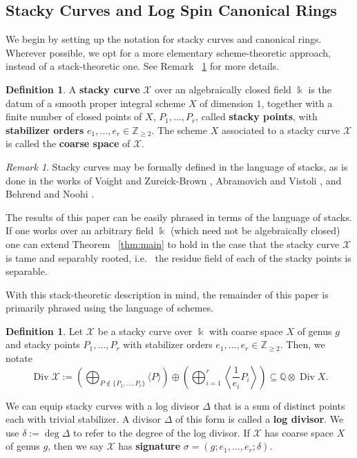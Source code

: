\documentclass{amsart}
\theoremstyle{plain}
\theoremstyle{definition}
\newtheorem{defn}[thm]{Definition}
\theoremstyle{remark}
\newtheorem{rem}[thm]{Remark}
\numberwithin{equation}{section}
\newcommand\ssec{\subsection}
\newcommand\BQ{{\mathbb Q}}
\newcommand\BZ{{\mathbb Z}}
\newcommand\Bk{{\Bbbk}}
\DeclareMathOperator\di{Div}
\newcommand\sx{\mathscr X}
\begin{document}
\ssec{Stacky Curves and Log Spin Canonical Rings}
\label{ssec:stacky-background}
We begin by setting up the notation for stacky curves and canonical rings. Wherever possible, we opt for a more elementary scheme-theoretic approach, instead of a stack-theoretic one. See Remark ~\ref{rem:stack-formalism} for more details.

\begin{defn}
\label{defn:stacky-curve}
A \textbf{stacky curve} $\sx$ over an algebraically closed field $\Bk$ is the datum of a smooth proper integral scheme $X$ of dimension $1$, together with a finite number of closed points of $X$, $P_1, \ldots, P_r$, called {\bf stacky points}, with {\bf stabilizer orders} $e_1, \ldots, e_r \in \BZ_{\geq 2}.$ The scheme $X$ associated to a stacky curve $\sx$ is called the {\bf coarse space} of $\sx$.
\end{defn}

\begin{rem}
\label{rem:stack-formalism}
Stacky curves may be formally defined in the language of stacks, as
is done in the works of Voight and Zureick-Brown \cite{vzb:stacky},
Abramovich and Vistoli \cite{abramovich-vistoli:compactifying}, and
Behrend and Noohi \cite{behrend-noohi:uniformization}.

The results of this paper can be easily phrased in terms of the language of stacks. If one works over an arbitrary field $\Bk$ (which need not be algebraically closed) one can extend Theorem ~\ref{thm:main} to hold in the case that the stacky curve $\sx$ is tame and separably rooted, i.e.~ the residue field of each
of the stacky points is separable.

With this stack-theoretic description in mind, the remainder of this paper is primarily phrased using the language
of schemes.
\end{rem}

\begin{defn}
\label{defn:div-ex}
Let $\sx$ be a stacky curve over $\Bk$ with coarse space $X$ of genus $g$ and stacky points $P_1, \ldots,
P_r$ with stabilizer orders $e_1, \ldots, e_r \in \BZ_{\geq 2}$.
Then, we notate
\[
	\di \sx := \left(\bigoplus_{P\notin \{P_1, \ldots, P_r\}} \langle 
	P \rangle \right) \oplus \left(\bigoplus_{i = 1}^r \left \langle 
	\frac{1}{e_i}P_i \right \rangle \right) \subseteq \BQ \otimes \di X.
\]
\end{defn}

We can equip stacky curves with a log divisor $\Delta$ that is a 
sum of distinct points each with trivial stabilizer. 
A divisor
$\Delta$ of this form is called a \textbf{log divisor}. We use
$\delta := \deg \Delta$ to refer to the degree of the log divisor.
If $\sx$ has coarse space $X$ of genus $g$, then we say $\sx$ has
\textbf{signature} $\sigma = (g; e_1, \ldots, e_r; \delta)$.
\end{document}
